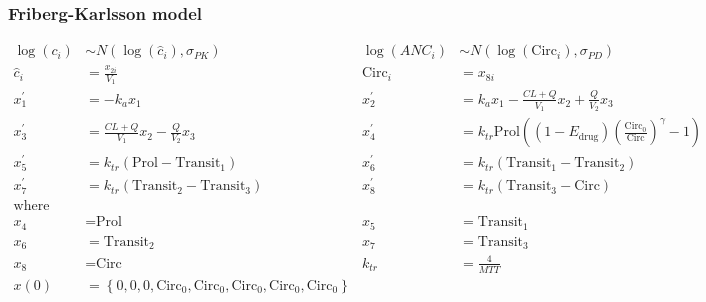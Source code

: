 \documentclass[handout]{beamer}
\begin{document}
\begin{frame}
\frametitle{Friberg-Karlsson model}

\vspace{-24pt}
  \begin{scriptsize}
    \begin{align*}
     \log\left(c_i\right) &\sim
                                N\left(\log\left(\hat{c}_i\right),\sigma_{PK}\right)
                                &  \log\left(ANC_i\right) &\sim
                                                                   N\left(\log\left(\text{Circ}_i\right),\sigma_{PD}\right) \\
      \hat{c}_i &= \frac{x_{2i}}{V_{1}} 
      & \text{Circ}_{i} &= x_{8i} \\
x_1^\prime &= -k_a x_1 &
x_2^\prime &= k_a x_1 - \frac{CL + Q}{V_1} x_2 + \frac{Q}{V_2}
             x_3 \\
x_3^\prime &= \frac{CL + Q}{V_1} x_2 - \frac{Q}{V_2}  x_3 &
x_4^\prime &= k_{tr} \text{Prol} \left((1 - E_\text{drug})
             \left(\frac{\text{Circ}_0}{\text{Circ}}\right)^\gamma -
             1\right) \\ 
x_5^\prime &= k_{tr} (\text{Prol} - \text{Transit}_1) &
x_6^\prime &= k_{tr} (\text{Transit}_1 - \text{Transit}_2) \\
x_7^\prime &= k_{tr} (\text{Transit}_2 - \text{Transit}_3) &
x_8^\prime &= k_{tr} (\text{Transit}_3 - \text{Circ}) \\
\text{where} \\
x_4 &= \text{Prol}  &
x_5 &= \text{Transit}_1 \\
x_6 &= \text{Transit}_2 &
 x_7 &= \text{Transit}_3 \\
x_8 &= \text{Circ} &
k_{tr} &= \frac{4}{MTT} \\
x\left(0\right) &= \left\{0, 0, 0, \text{Circ}_0, \text{Circ}_0,
                  \text{Circ}_0, \text{Circ}_0, \text{Circ}_0\right\}
    \end{align*}
  \end{scriptsize}

\end{frame}
\end{document}
